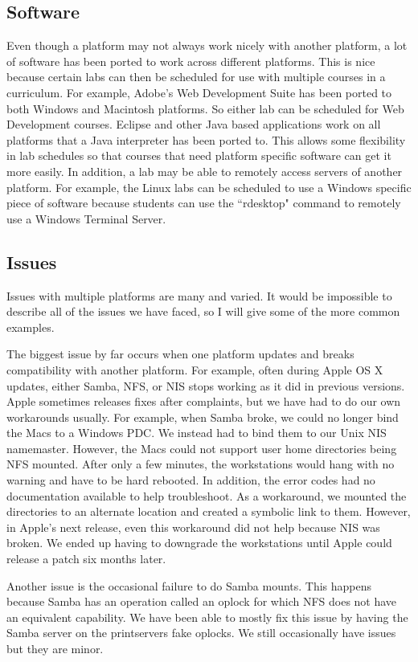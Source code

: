\subsection{Software}
Even though a platform may not always work nicely with another platform, a lot of software has been ported to work across different platforms.  This is nice because certain labs can then be scheduled for use with multiple courses in a curriculum.  For example, Adobe's Web Development Suite has been ported to both Windows and Macintosh platforms.  So either lab can be scheduled for Web Development courses.  Eclipse and other Java based applications work on all platforms that a Java interpreter has been ported to.  This allows some flexibility in lab schedules so that courses that need platform specific software can get it more easily.  In addition, a lab may be able to remotely access servers of another platform.  For example, the Linux labs can be scheduled to use a Windows specific piece of software because students can use the ``rdesktop" command to remotely use a Windows Terminal Server.  

\subsection{Issues}
Issues with multiple platforms are many and varied.  It would be impossible to describe all of the issues we have faced, so I will give some of the more common examples.  

The biggest issue by far occurs when one platform updates and breaks compatibility with another platform.  For example, often during Apple OS X updates, either Samba, NFS, or NIS stops working as it did in previous versions.  Apple sometimes releases fixes after complaints, but we have had to do our own workarounds usually.  For example, when Samba broke, we could no longer bind the Macs to a Windows PDC.  We instead had to bind them to our Unix NIS namemaster.  However, the Macs could not support user home directories being NFS mounted.  After only a few minutes, the workstations would hang with no warning and have to be hard rebooted.  In addition, the error codes had no documentation available to help troubleshoot.  As a workaround, we mounted the directories to an alternate location and created a symbolic link to them.  However, in Apple's next release, even this workaround did not help because NIS was broken.  We ended up having to downgrade the workstations until Apple could release a patch six months later.

Another issue is the occasional failure to do Samba mounts.  This happens because Samba has an operation called an oplock for which NFS does not have an equivalent capability.  We have been able to mostly fix this issue by having the Samba server on the printservers fake oplocks.  We still occasionally have issues but they are minor.  

